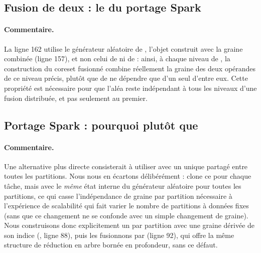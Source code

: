 \subsection{Fusion de deux  : le  du portage Spark}



\paragraph{Commentaire.} La ligne 162 utilise le générateur aléatoire de
, l'objet construit avec la graine combinée  (ligne 157), et non celui de  ni de  :
ainsi, à chaque niveau de , la construction du coreset
fusionné combine réellement la graine des deux opérandes de ce niveau
précis, plutôt que de ne dépendre que d'un seul d'entre eux. Cette propriété
est nécessaire pour que l'aléa reste indépendant à tous les niveaux d'une
fusion distribuée, et pas seulement au premier.

\subsection{Portage Spark : pourquoi  plutôt que }



\paragraph{Commentaire.} Une alternative plus directe consisterait à
utiliser  avec un
 unique partagé entre toutes les partitions. Nous nous en
écartons délibérément :  clone ce  pour
chaque tâche, mais avec le \emph{même} état interne du générateur aléatoire
pour toutes les partitions, ce qui casse l'indépendance de graine par
partition nécessaire à l'expérience de scalabilité qui fait varier le
nombre de partitions à données fixes (sans que ce changement ne se confonde
avec un simple changement de graine). Nous construisons donc explicitement
un  par partition avec une graine dérivée de son indice
(, ligne 88), puis les fusionnons par 
(ligne 92), qui offre la même structure de réduction en arbre bornée en
profondeur, sans ce défaut.

